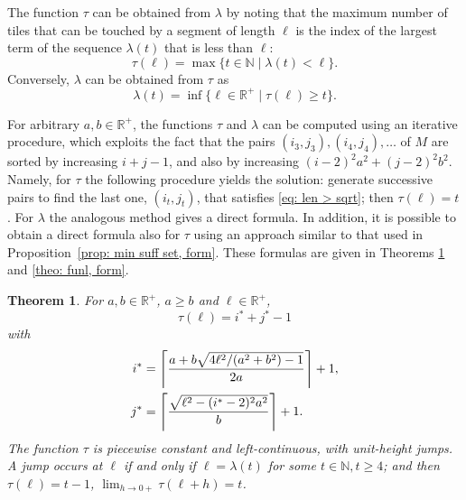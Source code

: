 \documentclass[12pt, a4paper]{article}
\newcommand{\st}{\mid}%
\let\Re\relax %
\DeclareMathOperator{\Re}{Re} %
\newcommand{\funt}{\tau} %
\newcommand{\funl}{\lambda} %
\newcommand{\len}{\ell} %
\newcommand{\tiles}{t} %
\newcommand{\isoli}{i^\ast}
\newcommand{\jsoli}{j^\ast}
\newcommand{\mss}{M}
\newtheorem{theorem}{Theorem}%
\begin{document}
The function $\funt$ can be obtained from $\funl$ by noting that the maximum number of tiles that can be touched by a segment of length $\len$ is the index of the largest term of the sequence $\funl(\tiles)$ that is less than $\len$:
\begin{equation}
\label{eq: funt funl}
\funt(\len) = \max \{\tiles \in \mathbb N \st \funl(\tiles)<\len\}.
\end{equation}
Conversely, $\funl$ can be obtained from $\funt$ as
\begin{equation}
\label{eq: funl funt}
\funl(\tiles) = \inf\{\len \in \mathbb R^+ \st \funt(\len) \geq \tiles\}.
\end{equation}

For arbitrary $a, b \in \mathbb R^+$, the functions $\funt$ and $\funl$ can be computed using an iterative procedure, which exploits the fact that the pairs $(i_3,j_3), (i_4,j_4), \ldots$ of $\mss$ are sorted by increasing $i+j-1$, and also by increasing $(i-2)^2 a^2 + (j-2)^2 b^2$. Namely, for $\funt$ the following procedure yields the solution: generate successive pairs to find the last one, $(i_\tiles,j_\tiles)$, that satisfies \eqref{eq: len > sqrt}; then $\funt(\len) = \tiles$. For $\funl$ the analogous method gives a direct formula. In addition, it is possible to obtain a direct formula also for $\funt$ using an approach similar to that used in Proposition~\ref{prop: min suff set, form}. These formulas are given in Theorems \ref{theo: funt, form} and \ref{theo: funl, form}.

\begin{theorem}
\label{theo: funt, form}
For $a, b \in \mathbb R^+$, $a \geq b$ and $\len \in \mathbb R^+$,
\begin{equation}
\label{eq: theo: funt, form; funt}
\funt(\len) = \isoli+\jsoli-1
\end{equation}
with
\begin{align}
\label{eq: theo: funt, form; i}
\isoli &= \left\lceil \frac{a + b \Re \sqrt{4\len^2/(a^2+b^2)-1}}{2a} \right\rceil + 1, \\
\label{eq: theo: funt, form; j}
\jsoli &= \left\lceil \frac{\sqrt{\len^2-(\isoli-2)^2a^2}}{b} \right\rceil + 1.
\end{align}
The function $\funt$ is piecewise constant and left-continuous, with unit-height jumps. A jump occurs at $\len$ if and only if $\len = \funl(\tiles)$ for some $\tiles \in \mathbb N, \tiles \geq 4$; and then $\funt(\len) = \tiles-1$, $\lim_{h \rightarrow 0+} \funt(\len+h) = \tiles$.
\end{theorem}
\end{document}
